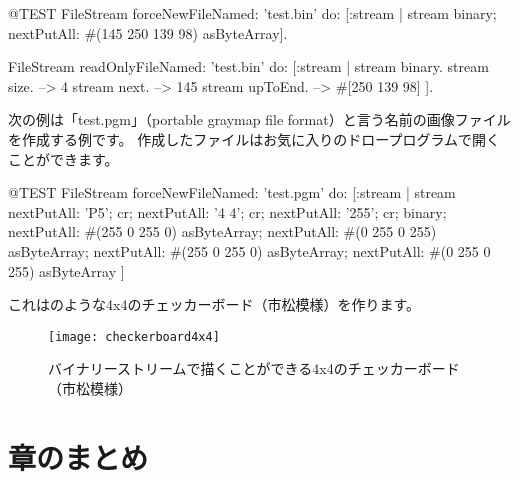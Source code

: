 \documentclass[a4paper,10pt,twoside]{book}
\begin{document}
\begin{code}{@TEST}
FileStream
  forceNewFileNamed: 'test.bin'
  do: [:stream |
          stream
            binary;
            nextPutAll: #(145 250 139 98) asByteArray].

FileStream
  readOnlyFileNamed: 'test.bin'
  do: [:stream |
          stream binary.
          stream size.         --> 4
          stream next.         --> 145
          stream upToEnd. --> #[250 139 98]
      ].
\end{code}

次の例は「test.pgm」（portable graymap file format）と言う名前の画像ファイルを作成する例です。
作成したファイルはお気に入りのドロープログラムで開くことができます。


\begin{code}{@TEST}
FileStream
  forceNewFileNamed: 'test.pgm' 
  do: [:stream |
	stream
		nextPutAll: 'P5'; cr;
		nextPutAll: '4 4'; cr;
		nextPutAll: '255'; cr;
		binary;
		nextPutAll: #(255 0 255 0) asByteArray;
		nextPutAll: #(0 255 0 255) asByteArray;
		nextPutAll: #(255 0 255 0) asByteArray;
		nextPutAll: #(0 255 0 255) asByteArray
	]
\end{code}

これはのような4x4のチェッカーボード（市松模様）を作ります。

\begin{figure}[!ht]
\centerline{\texttt{[image: checkerboard4x4]}}
\caption{バイナリーストリームで描くことができる4x4のチェッカーボード（市松模様）}
\vspace{.2in}
\end{figure}

\section{章のまとめ}
\end{document}
